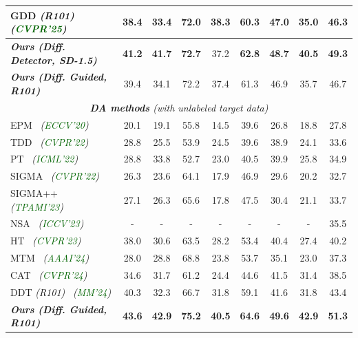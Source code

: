 \begin{table}[ht]
{\begin{tabular}{l|ccccccc>{\columncolor{gray!20}}c}
    GDD \footnotesize{\textit{(R101)}}\normalsize~\cite{gdd}  \textit{\scriptsize{(\textcolor{darkgreen}{CVPR'25})}} & 38.4 & 33.4 & 72.0 & \textbf{38.3} & 60.3 & 47.0 & 35.0 & 46.3 \\
    \midrule
    \rowcolor{lightgreen}
    \textit{\textbf{Ours \footnotesize{(Diff. Detector, SD-1.5)}}} & \textbf{41.2} & \textbf{41.7} & \textbf{72.7} & 37.2 & \textbf{62.8} & \textbf{48.7} & \textbf{40.5} & \textbf{49.3} \\
    \textit{\textbf{Ours \footnotesize{(Diff. Guided, R101)}}} \normalsize & 39.4 & 34.1 & 72.2 & 37.4 & 61.3 & 46.9 & 35.7 & 46.7 \\
    \midrule \midrule
    \multicolumn{9}{c}{\textit{\textbf{DA methods} (with unlabeled target data)}} \\
    EPM~\cite{hsu2020epm} \textit{\scriptsize{(\textcolor{darkgreen}{ECCV'20})}} & 20.1 & 19.1 & 55.8 & 14.5 & 39.6 & 26.8 & 18.8 & 27.8 \\
    TDD~\cite{tdd} \textit{\scriptsize{(\textcolor{darkgreen}{CVPR'22})}} & 28.8 & 25.5 & 53.9 & 24.5 & 39.6 & 38.9 & 24.1 & 33.6 \\
    PT~\cite{pt} \textit{\scriptsize{(\textcolor{darkgreen}{ICML'22})}}& 28.8 & 33.8 & 52.7 & 23.0 & 40.5 & 39.9 & 25.8 & 34.9 \\
    SIGMA~\cite{li2022sigma} \textit{\scriptsize{(\textcolor{darkgreen}{CVPR'22})}}& 26.3 & 23.6 & 64.1 & 17.9 & 46.9 & 29.6 & 20.2 & 32.7 \\
    SIGMA++~\cite{li2023sigma++} \textit{\scriptsize{(\textcolor{darkgreen}{TPAMI'23})}}& 27.1 & 26.3 & 65.6 & 17.8 & 47.5 & 30.4 & 21.1 & 33.7 \\
    NSA~\cite{nsa} \textit{\scriptsize{(\textcolor{darkgreen}{ICCV'23})}}& - & - & - & - & - & - & - & 35.5 \\
    HT~\cite{deng2023HT} \textit{\scriptsize{(\textcolor{darkgreen}{CVPR'23})}}& 38.0 & 30.6 & 63.5 & 28.2 & 53.4 & 40.4 & 27.4 & 40.2 \\
    MTM~\cite{mtm} \textit{\scriptsize{(\textcolor{darkgreen}{AAAI'24})}} & 28.0 & 28.8 & 68.8 & 23.8 & 53.7 & 35.1 & 23.0 & 37.3 \\
    CAT~\cite{cat} \textit{\scriptsize{(\textcolor{darkgreen}{CVPR'24})}} & 34.6 & 31.7 & 61.2 & 24.4 & 44.6 & 41.5 & 31.4 & 38.5 \\
    DDT \footnotesize{\textit{(R101)}}\normalsize~\cite{ddt} \textit{\scriptsize{(\textcolor{darkgreen}{MM'24})}} & 40.3 & 32.3 & 66.7 & 31.8 & 59.1 & 41.6 & 31.8 & 43.4 \\
    \midrule
    \rowcolor{lightgreen}
    \textit{\textbf{Ours \footnotesize{(Diff. Guided, R101)}}} & \textbf{43.6} & \textbf{42.9} & \textbf{75.2} & \textbf{40.5} & \textbf{64.6} & \textbf{49.6} & \textbf{42.9} & \textbf{51.3} \\
    \bottomrule
    \end{tabular}%
    }
    \end{table}

